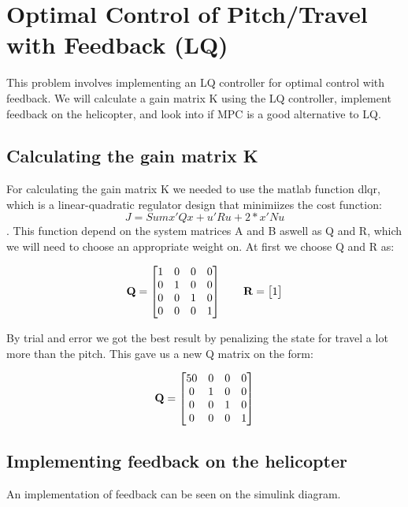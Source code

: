 \section{Optimal Control of Pitch/Travel with Feedback (LQ)}\label{sec:prob3}
This problem involves implementing an LQ controller for optimal control with feedback. We will calculate a gain matrix K using the LQ controller, implement feedback on the helicopter, and look into if MPC is a good alternative to LQ.

\subsection{Calculating the gain matrix K}
For calculating the gain matrix K we needed to use the matlab function dlqr, which is a linear-quadratic regulator design that minimiizes the cost function: 
\begin{equation}  
J = Sum {x'Qx + u'Ru + 2*x'Nu} 
\end{equation}. 
This function depend on the system matrices A and B aswell as Q and R, which we will need to choose an appropriate weight on. At first we choose Q and R as:

\begin{equation}
\bold{Q} = 
\begin{bmatrix}
1 & 0 & 0 & 0 \\
0 & 1 & 0 & 0 \\
0 & 0 & 1 & 0 \\
0 & 0 & 0 & 1 
\end{bmatrix}
\qquad\bold{R}=
\begin{bmatrix}
1
\end{bmatrix}
\end{equation}

 By trial and error we got the best result by penalizing the state for travel a lot more than the pitch. This gave us a new Q matrix on the form:

\begin{equation}
\bold{Q} = 
\begin{bmatrix}
50 & 0 & 0 & 0 \\
0 & 1 & 0 & 0 \\
0 & 0 & 1 & 0 \\
0 & 0 & 0 & 1
\end{bmatrix}
\end{equation}

\subsection{Implementing feedback on the helicopter}
An implementation of feedback can be seen on the simulink diagram.

